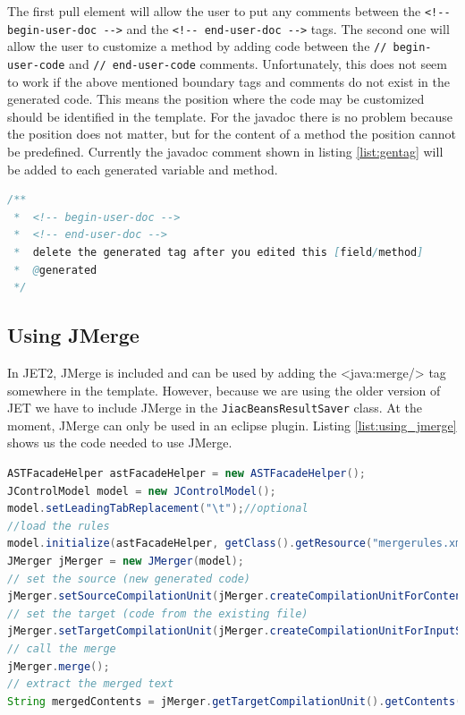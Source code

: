 The first pull element will allow the user to put any comments between the \verb|<!-- begin-user-doc -->| and the \verb|<!-- end-user-doc -->| tags. The second one will allow the user to customize a method by adding code between the  \verb|// begin-user-code| and \verb|// end-user-code| comments. Unfortunately, this does not seem to work if the above mentioned boundary tags and comments do not exist in the generated code. This means the position where the code may be customized should be identified in the template. For the javadoc there is no problem because the position does not matter, but for the content of a method the position cannot be predefined. Currently the javadoc comment shown in listing \ref{list:gentag} will be added to each generated variable and method.

\begin{lstlisting}[language=Java, caption = Javadoc Comment Used For JMerge, label=list:gentag]
/**
 *  <!-- begin-user-doc -->
 *  <!-- end-user-doc -->
 *	delete the generated tag after you edited this [field/method]
 *  @generated
 */
\end{lstlisting}

\subsection{Using JMerge}
In JET2, JMerge is included and can be used by adding the <java:merge/> tag somewhere in the template. However, because we are using the older version of JET we have to include JMerge in the \verb|JiacBeansResultSaver| class. At the moment, JMerge can only be used in an eclipse plugin. Listing \ref{list:using_jmerge} shows us the code needed to use JMerge.
\newpage
\begin{lstlisting}[language=java, caption=Using JMerge, label=list:using_jmerge]
ASTFacadeHelper astFacadeHelper = new ASTFacadeHelper();
JControlModel model = new JControlModel(); 
model.setLeadingTabReplacement("\t");//optional
//load the rules
model.initialize(astFacadeHelper, getClass().getResource("mergerules.xml").toString());
JMerger jMerger = new JMerger(model); 
// set the source (new generated code)
jMerger.setSourceCompilationUnit(jMerger.createCompilationUnitForContents(content));
// set the target (code from the existing file)
jMerger.setTargetCompilationUnit(jMerger.createCompilationUnitForInputStream(new FileInputStream(f))); 
// call the merge
jMerger.merge(); 
// extract the merged text
String mergedContents = jMerger.getTargetCompilationUnit().getContents();
\end{lstlisting}

